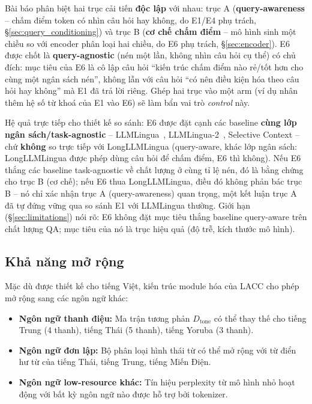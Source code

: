 \documentclass[12pt,a4paper]{article}
\newcommand{\method}[1]{\textsc{#1}}         %
\begin{document}
Bài báo phân biệt hai trục cải tiến \textbf{độc lập} với nhau: trục A (\textbf{query-awareness} -- chấm điểm token có nhìn câu hỏi hay không, do E1/E4 phụ trách, \S\ref{sec:query_conditioning}) và trục B (\textbf{cơ chế chấm điểm} -- mô hình sinh một chiều so với encoder phân loại hai chiều, do E6 phụ trách, \S\ref{sec:encoder}). E6 được chốt là \textbf{query-agnostic} (nén một lần, không nhìn câu hỏi cụ thể) có chủ đích: mục tiêu của E6 là cô lập câu hỏi ``kiến trúc chấm điểm nào rẻ/tốt hơn cho cùng một ngân sách nén'', không lẫn với câu hỏi ``có nên điều kiện hóa theo câu hỏi hay không'' mà E1 đã trả lời riêng. Ghép hai trục vào một arm (ví dụ nhân thêm hệ số từ khoá của E1 vào E6) sẽ làm bẩn vai trò \textit{control} này.

Hệ quả trực tiếp cho thiết kế so sánh: E6 được đặt cạnh các baseline \textbf{cùng lớp ngân sách/task-agnostic} -- LLMLingua~\cite{jiang2023llmlingua}, LLMLingua-2~\cite{pan2024llmlingua2}, Selective Context -- chứ \textbf{không} so trực tiếp với LongLLMLingua (query-aware, khác lớp ngân sách: LongLLMLingua được phép dùng câu hỏi để chấm điểm, E6 thì không). Nếu E6 thắng các baseline task-agnostic về chất lượng ở cùng tỉ lệ nén, đó là bằng chứng cho trục B (cơ chế); nếu E6 thua LongLLMLingua, điều đó không phản bác trục B -- nó chỉ xác nhận trục A (query-awareness) quan trọng, một kết luận trục A đã tự đứng vững qua so sánh E1 với LLMLingua thường. Giới hạn (\S\ref{sec:limitations}) nói rõ: E6 không đặt mục tiêu thắng baseline query-aware trên chất lượng QA; mục tiêu của nó là trục hiệu quả (độ trễ, kích thước mô hình).

\subsection{Khả năng mở rộng}

Mặc dù được thiết kế cho tiếng Việt, kiến trúc module hóa của \method{LACC} cho phép mở rộng sang các ngôn ngữ khác:

\begin{itemize}
    \item \textbf{Ngôn ngữ thanh điệu:} Ma trận tương phản $D_{\text{tone}}$ có thể thay thế cho tiếng Trung (4 thanh), tiếng Thái (5 thanh), tiếng Yoruba (3 thanh).
    \item \textbf{Ngôn ngữ đơn lập:} Bộ phân loại hình thái từ có thể mở rộng với từ điển hư từ của tiếng Thái, tiếng Trung, tiếng Miến Điện.
    \item \textbf{Ngôn ngữ low-resource khác:} Tín hiệu perplexity từ mô hình nhỏ hoạt động với bất kỳ ngôn ngữ nào được hỗ trợ bởi tokenizer.
\end{itemize}
\end{document}
